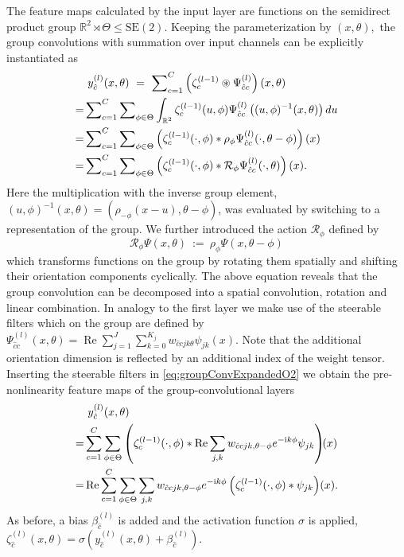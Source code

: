 \documentclass[10pt,twocolumn,letterpaper]{article}
\newcommand{\real}{\operatorname{Re}}
\newcommand{\ci}{\mathrm{i}}
\newcommand{\R}{\mathbb{R}}
\begin{document}
The feature maps calculated by the input layer are functions on the semidirect product group $\R^2\rtimes\Theta\leq\text{SE}(2).$
Keeping the parameterization by $(x,\theta),$ the group convolutions 
with summation over input channels 
can be explicitly instantiated as
\allowdisplaybreaks
\begin{align}\label{eq:groupConvExpandedO2}
	&\ y_{\hat{c}}^{(l)}(x,\theta)\ =\ \sum\nolimits_{c=1}^{C}\left(\zeta_c^{(l-1)} \circledast \Psi_{\hat{c}c}^{(l)}\right)(x, \theta) \\
	=& \sum\nolimits_{c=1}^{C}\sum\nolimits_{\phi \in \Theta} \int_{\R^2} \zeta_c^{(l-1)}(u, \phi)\Psi_{\hat{c}c}^{(l)}\left((u,\phi)^{-1}(x,\theta)\right) du \notag\\
	=& \sum\nolimits_{c=1}^{C}\sum\nolimits_{\phi \in \Theta} \left(\zeta_c^{(l-1)}(\cdot, \phi) * \rho_{\phi}\Psi_{\hat{c}c}^{(l)}(\cdot, \theta - \phi)\right)(x) \notag\\
	=& \sum\nolimits_{c=1}^{C}\sum\nolimits_{\phi \in \Theta} \left(\zeta_c^{(l-1)}(\cdot, \phi) * \mathcal{R}_{\phi}\Psi_{\hat{c}c}^{(l)}(\cdot, \theta)\right)(x).\notag
\end{align}
Here the multiplication with the inverse group element, $(u,\phi)^{-1}(x,\theta) = (\rho_{-\phi}(x-u), \theta-\phi)$, was evaluated by switching to a representation of the group.
We further introduced the action $\mathcal{R}_{\phi}$ defined by
\[
	\mathcal{R}_{\phi} \Psi(x,\theta) \ :=\ \rho_{\phi} \Psi(x,\theta-\phi)
\]
which transforms functions on the group by rotating them spatially and shifting their orientation components cyclically.
The above equation reveals that the group convolution can be decomposed into a spatial convolution, rotation and linear combination.
In analogy to the first layer we make use of the steerable filters which on the group are defined by
$
	\Psi_{\hat{c}c}^{(l)}(x, \theta) = \real \sum\nolimits_{j=1}^{J} \sum\nolimits_{k=0}^{K_j} w_{\hat{c}cjk\theta} \psi_{jk}(x).
$
Note that the additional orientation dimension is reflected by an additional index of the weight tensor.
Inserting the steerable filters in \eqref{eq:groupConvExpandedO2} we obtain the pre-nonlinearity feature maps of the group-convolutional layers
\begin{align}\label{eq:groupConvFilter}
	&\ y^{(l)}_{\hat{c}}(x,\theta) \\
	=& \sum_{c=1}^{C} \sum_{\phi\in\Theta} \left( \zeta_c^{(l-1)}(\cdot, \phi) \ast \real \sum_{j,k} w_{\hat{c}cjk,\theta-\phi} e^{- \ci k\phi} \psi_{jk}\right)\!\!(x)\notag\\
	=& \real \sum_{c=1}^{C} \sum_{\phi\in\Theta} \sum_{j,k} w_{\hat{c}cjk,\theta-\phi} e^{- \ci k\phi} \left(\zeta_c^{(l-1)}(\cdot, \phi) * \psi_{jk}\right)\!(x).\notag
\end{align}
As before, a bias $\beta^{(l)}_{\hat{c}}$ is added and the activation function $\sigma$ is applied,
$\zeta^{(l)}_{\hat{c}}(x,\theta) = \sigma(y^{(l)}_{\hat{c}}(x,\theta) + \beta^{(l)}_{\hat{c}}).$
\end{document}
